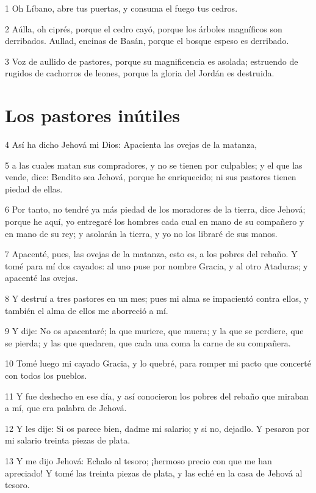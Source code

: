 \par 1 Oh Líbano, abre tus puertas, y consuma el fuego tus cedros.
\par 2 Aúlla, oh ciprés, porque el cedro cayó, porque los árboles magníficos son derribados. Aullad, encinas de Basán, porque el bosque espeso es derribado.
\par 3 Voz de aullido de pastores, porque su magnificencia es asolada; estruendo de rugidos de cachorros de leones, porque la gloria del Jordán es destruida.

\section*{Los pastores inútiles}

\par 4 Así ha dicho Jehová mi Dios: Apacienta las ovejas de la matanza,
\par 5 a las cuales matan sus compradores, y no se tienen por culpables; y el que las vende, dice: Bendito sea Jehová, porque he enriquecido; ni sus pastores tienen piedad de ellas.
\par 6 Por tanto, no tendré ya más piedad de los moradores de la tierra, dice Jehová; porque he aquí, yo entregaré los hombres cada cual en mano de su compañero y en mano de su rey; y asolarán la tierra, y yo no los libraré de sus manos.
\par 7 Apacenté, pues, las ovejas de la matanza, esto es, a los pobres del rebaño. Y tomé para mí dos cayados: al uno puse por nombre Gracia, y al otro Ataduras; y apacenté las ovejas.
\par 8 Y destruí a tres pastores en un mes; pues mi alma se impacientó contra ellos, y también el alma de ellos me aborreció a mí.
\par 9 Y dije: No os apacentaré; la que muriere, que muera; y la que se perdiere, que se pierda; y las que quedaren, que cada una coma la carne de su compañera.
\par 10 Tomé luego mi cayado Gracia, y lo quebré, para romper mi pacto que concerté con todos los pueblos.
\par 11 Y fue deshecho en ese día, y así conocieron los pobres del rebaño que miraban a mí, que era palabra de Jehová.
\par 12 Y les dije: Si os parece bien, dadme mi salario; y si no, dejadlo. Y pesaron por mi salario treinta piezas de plata.
\par 13 Y me dijo Jehová: Echalo al tesoro; ¡hermoso precio con que me han apreciado! Y tomé las treinta piezas de plata, y las eché en la casa de Jehová al tesoro. 
